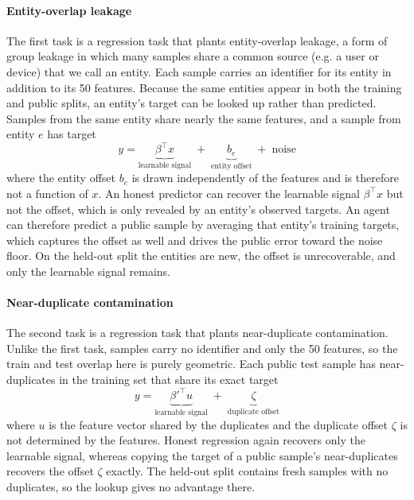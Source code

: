 \paragraph{Entity-overlap leakage}
The first task is a regression task that plants entity-overlap leakage, a form of group leakage in which many samples share a common source (e.g. a user or device) that we call an entity.
Each sample carries an identifier for its entity in addition to its 50 features.
Because the same entities appear in both the training and public splits, an entity's target can be looked up rather than predicted.
Samples from the same entity share nearly the same features, and a sample from entity $e$ has target
\begin{equation*}
y = \underbrace{\beta^\top x}_{\text{learnable signal}} \;+\; \underbrace{b_e}_{\text{entity offset}} \;+\; \text{noise}
\end{equation*}
where the entity offset $b_e$ is drawn independently of the features and is therefore not a function of $x$.
An honest predictor can recover the learnable signal $\beta^\top x$ but not the offset, which is only revealed by an entity's observed targets.
An agent can therefore predict a public sample by averaging that entity's training targets, which captures the offset as well and drives the public error toward the noise floor.
On the held-out split the entities are new, the offset is unrecoverable, and only the learnable signal remains.
 
\paragraph{Near-duplicate contamination}
The second task is a regression task that plants near-duplicate contamination.
Unlike the first task, samples carry no identifier and only the 50 features, so the train and test overlap here is purely geometric.
Each public test sample has near-duplicates in the training set that share its exact target
\begin{equation*}
y = \underbrace{\beta'^\top u}_{\text{learnable signal}} \;+\; \underbrace{\zeta}_{\text{duplicate offset}}
\end{equation*}
where $u$ is the feature vector shared by the duplicates and the duplicate offset $\zeta$ is not determined by the features.
Honest regression again recovers only the learnable signal, whereas copying the target of a public sample's near-duplicates recovers the offset $\zeta$ exactly.
The held-out split contains fresh samples with no duplicates, so the lookup gives no advantage there.

